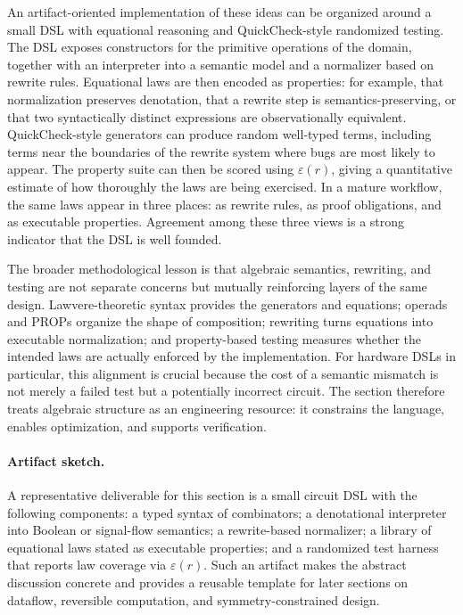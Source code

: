 An artifact-oriented implementation of these ideas can be organized around a small DSL with equational reasoning and QuickCheck-style randomized testing. The DSL exposes constructors for the primitive operations of the domain, together with an interpreter into a semantic model and a normalizer based on rewrite rules. Equational laws are then encoded as properties: for example, that normalization preserves denotation, that a rewrite step is semantics-preserving, or that two syntactically distinct expressions are observationally equivalent. QuickCheck-style generators can produce random well-typed terms, including terms near the boundaries of the rewrite system where bugs are most likely to appear. The property suite can then be scored using \(\varepsilon(r)\), giving a quantitative estimate of how thoroughly the laws are being exercised. In a mature workflow, the same laws appear in three places: as rewrite rules, as proof obligations, and as executable properties. Agreement among these three views is a strong indicator that the DSL is well founded.

The broader methodological lesson is that algebraic semantics, rewriting, and testing are not separate concerns but mutually reinforcing layers of the same design. Lawvere-theoretic syntax provides the generators and equations; operads and PROPs organize the shape of composition; rewriting turns equations into executable normalization; and property-based testing measures whether the intended laws are actually enforced by the implementation. For hardware DSLs in particular, this alignment is crucial because the cost of a semantic mismatch is not merely a failed test but a potentially incorrect circuit. The section therefore treats algebraic structure as an engineering resource: it constrains the language, enables optimization, and supports verification.

\paragraph{Artifact sketch.} A representative deliverable for this section is a small circuit DSL with the following components: a typed syntax of combinators; a denotational interpreter into Boolean or signal-flow semantics; a rewrite-based normalizer; a library of equational laws stated as executable properties; and a randomized test harness that reports law coverage via \(\varepsilon(r)\). Such an artifact makes the abstract discussion concrete and provides a reusable template for later sections on dataflow, reversible computation, and symmetry-constrained design.

